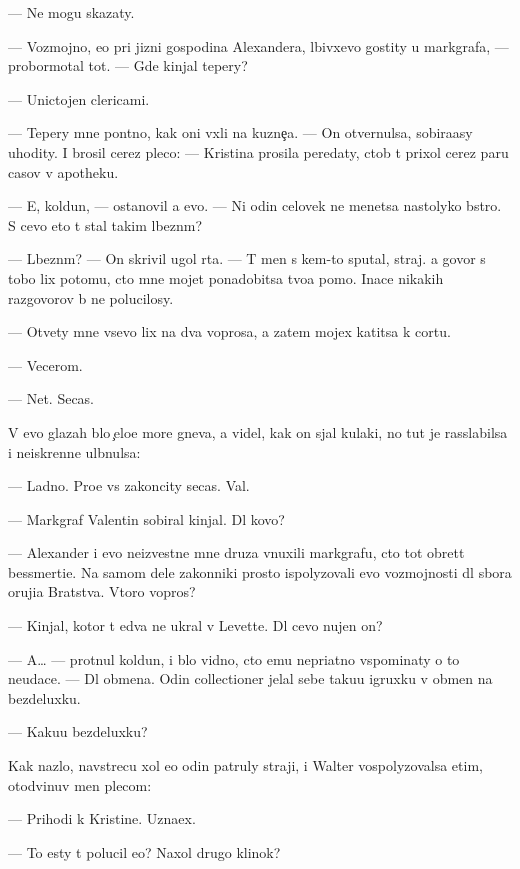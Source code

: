 \documentclass[10pt]{book}
\begin{document}
— Ne mogu skazaty.

— Vozmojno, {\y}e{\x}o pri jizni gospodina Alexandera, l{\io}bivxevo gostity u markgrafa, — probormotal tot. — Gde kinjal tepery?

— Unictojen clericami.

— Tepery mne pon{\ia}tno, kak oni v{\yi}xli na kuzne{\c}a. — On otvernulsa, sobira{\y}asy uhodity. I brosil cerez pleco: — Kristina prosila peredaty, ctob{\yi} t{\yi} prixol cerez paru casov v apotheku.

— E{\y}, koldun, — ostanovil {\y}a {\y}evo. — Ni odin celovek ne men{\ia}{\y}etsa nastolyko b{\yi}stro. S cevo eto t{\yi} stal takim l{\io}bezn{\yi}m?

— L{\io}bezn{\yi}m? — On skrivil ugol rta. — T{\yi} men{\ia} s kem-to sputal, straj. {\Y}a govor{\io} s tobo{\y} lix potomu, cto mne mojet ponadobitsa tvo{\y}a pomo{\x}. Inace nikakih razgovorov b{\yi} ne polucilosy.

— Otvety mne vsevo lix na dva voprosa, a zatem mojex katitsa k cortu.

— Vecerom.

— Net. Se{\y}cas.

V {\y}evo glazah b{\yi}lo {\c}elo{\y}e more gneva, {\y}a videl, kak on sjal kulaki, no tut je rasslabilsa i neiskrenne ul{\yi}bnulsa:

— Ladno. Pro{\x}e vs{\e} zakoncity se{\y}cas. Val{\ia}{\y}.

— Markgraf Valentin sobiral kinjal{\yi}. Dl{\ia} kovo?

— Alexander i {\y}evo neizvestn{\yi}{\y}e mne druz{\y}a vnuxili markgrafu, cto tot obret{\e}t bessmerti{\y}e. Na samom dele zakonniki prosto ispolyzovali {\y}evo vozmojnosti dl{\ia} sbora oruji{\y}a Bratstva. Vtoro{\y} vopros?

— Kinjal, kotor{\yi}{\y} t{\yi} {\y}edva ne ukral v Levette. Dl{\ia} cevo nujen on?

— A… — prot{\ia}nul koldun, i b{\yi}lo vidno, cto {\y}emu nepri{\y}atno vspominaty o to{\y} neudace. — Dl{\ia} obmena. Odin collectioner jelal sebe taku{\y}u igruxku v obmen na bezdeluxku.

— Kaku{\y}u bezdeluxku?

Kak nazlo, navstrecu xol {\y}e{\x}o odin patruly straji, i Walter vospolyzovalsa etim, otodvinuv men{\ia} plecom:

— Prihodi k Kristine. Uzna{\y}ex.

— To {\y}esty t{\yi} polucil {\y}e{\y}o? Naxol drugo{\y} klinok?
\end{document}
